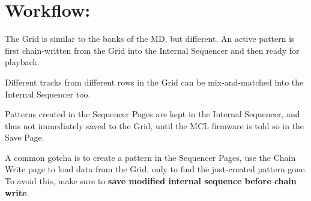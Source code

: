 \chapter{ Workflow: }

The Grid is similar to the banks of the MD, but different. An active pattern is first chain-written from the Grid into the Internal Sequencer and then ready for playback. 

Different tracks from different rows in the Grid can be mix-and-matched into the Internal Sequencer too.

Patterns created in the Sequencer Pages are kept in the Internal Sequencer, and thus not immediately saved to the Grid, until the MCL firmware is told so in the Save Page. 

A common gotcha is to create a pattern in the Sequencer Pages, use the Chain Write page to load data from the Grid, only to find the just-created pattern gone. To avoid this, make sure to \textbf{save modified internal sequence before chain write}.